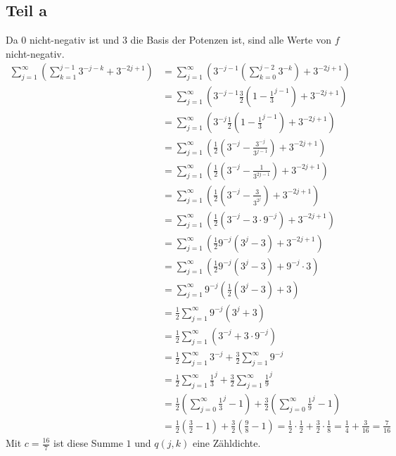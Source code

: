 \documentclass[10pt,a4paper]{article}
\begin{document}
\subsection{Teil a}
Da $0$ nicht-negativ ist und $3$ die Basis der Potenzen ist, sind alle Werte von $f$ nicht-negativ.
\begin{align*}
  \sum_{j = 1}^{\infty} \left( \sum_{k = 1}^{j - 1} 3^{-j -k} + 3^{-2j + 1} \right) & = \sum_{j = 1}^{\infty} \left( 3^{-j - 1} \left( \sum_{k = 0}^{j - 2} 3^{-k} \right) + 3^{-2j + 1} \right)\\
  & = \sum_{j = 1}^{\infty} \left( 3^{-j - 1} \frac{3}{2} \left( 1 - \frac{1}{3}^{j - 1} \right) + 3^{-2j + 1} \right)\\
  & = \sum_{j = 1}^{\infty} \left( 3^{-j} \frac{1}{2} \left( 1 - \frac{1}{3}^{j - 1} \right) + 3^{-2j + 1} \right)\\
  & = \sum_{j = 1}^{\infty} \left( \frac{1}{2} \left( 3^{-j} - \frac{3^{-j}}{3^{j - 1}} \right) + 3^{-2j + 1} \right)\\
  & = \sum_{j = 1}^{\infty} \left( \frac{1}{2} \left( 3^{-j} - \frac{1}{3^{2j - 1}} \right) + 3^{-2j + 1} \right)\\
  & = \sum_{j = 1}^{\infty} \left( \frac{1}{2} \left( 3^{-j} - \frac{3}{3^{2^{j}}} \right) + 3^{-2j + 1} \right)\\
  & = \sum_{j = 1}^{\infty} \left( \frac{1}{2} \left( 3^{-j} - 3 \cdot 9^{-j} \right) + 3^{-2j + 1} \right)\\
  & = \sum_{j = 1}^{\infty} \left( \frac{1}{2} 9^{-j} \left( 3^{j} - 3 \right) + 3^{-2j + 1} \right)\\
  & = \sum_{j = 1}^{\infty} \left( \frac{1}{2} 9^{-j} \left( 3^{j} - 3 \right) + 9^{-j} \cdot 3 \right)\\
  & = \sum_{j = 1}^{\infty} 9^{-j} \left( \frac{1}{2} \left( 3^{j} - 3 \right) + 3 \right)\\
  & = \frac{1}{2} \sum_{j = 1}^{\infty} 9^{-j} \left( 3^{j} + 3 \right)\\
  & = \frac{1}{2} \sum_{j = 1}^{\infty} \left( 3^{-j} + 3 \cdot 9^{-j} \right)\\
  & = \frac{1}{2} \sum_{j = 1}^{\infty} 3^{-j} + \frac{3}{2} \sum_{j = 1}^{\infty} 9^{-j}\\
  & = \frac{1}{2} \sum_{j = 1}^{\infty} \frac{1}{3}^{j} + \frac{3}{2} \sum_{j = 1}^{\infty} \frac{1}{9}^{j}\\
  & = \frac{1}{2} \left( \sum_{j = 0}^{\infty} \frac{1}{3}^{j} - 1 \right) + \frac{3}{2} \left( \sum_{j = 0}^{\infty} \frac{1}{9}^{j} - 1\right)\\
  & = \frac{1}{2} \left( \frac{3}{2} - 1 \right) + \frac{3}{2} \left( \frac{9}{8} - 1\right) = \frac{1}{2} \cdot \frac{1}{2} + \frac{3}{2} \cdot \frac{1}{8} = \frac{1}{4} + \frac{3}{16} = \frac{7}{16}
\end{align*}
Mit $c = \frac{16}{7}$ ist diese Summe $1$ und $q(j, k)$ eine Zähldichte.
\end{document}
